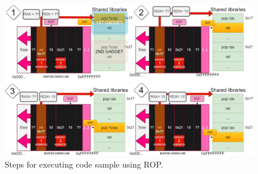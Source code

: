 \documentclass[12pt]{report} %
\begin{document}
\begin{figure}[H]
	\centering
	\includegraphics[width=16cm]{ROPcompound.jpg}
	\caption{Steps for executing code sample using ROP.}
	\label{fig:rop_compund}
\end{figure}
\end{document}
